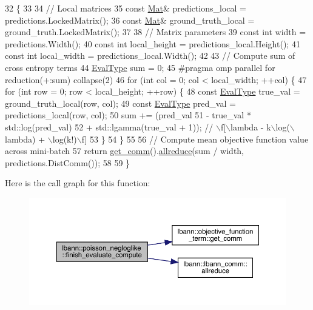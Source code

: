 \begin{DoxyCode}
32                                                                  \{
33 
34   \textcolor{comment}{// Local matrices}
35   \textcolor{keyword}{const} \hyperlink{base_8hpp_a68f11fdc31b62516cb310831bbe54d73}{Mat}& predictions\_local = predictions.LockedMatrix();
36   \textcolor{keyword}{const} \hyperlink{base_8hpp_a68f11fdc31b62516cb310831bbe54d73}{Mat}& ground\_truth\_local = ground\_truth.LockedMatrix();
37   
38   \textcolor{comment}{// Matrix parameters}
39   \textcolor{keyword}{const} \textcolor{keywordtype}{int} width = predictions.Width();
40   \textcolor{keyword}{const} \textcolor{keywordtype}{int} local\_height = predictions\_local.Height();
41   \textcolor{keyword}{const} \textcolor{keywordtype}{int} local\_width = predictions\_local.Width();
42 
43   \textcolor{comment}{// Compute sum of cross entropy terms}
44   \hyperlink{base_8hpp_a3266f5ac18504bbadea983c109566867}{EvalType} sum = 0;
45 \textcolor{preprocessor}{  #pragma omp parallel for reduction(+:sum) collapse(2)}
46   \textcolor{keywordflow}{for} (\textcolor{keywordtype}{int} col = 0; col < local\_width; ++col) \{
47     \textcolor{keywordflow}{for} (\textcolor{keywordtype}{int} row = 0; row < local\_height; ++row) \{
48       \textcolor{keyword}{const} \hyperlink{base_8hpp_a3266f5ac18504bbadea983c109566867}{EvalType} true\_val = ground\_truth\_local(row, col);
49       \textcolor{keyword}{const} \hyperlink{base_8hpp_a3266f5ac18504bbadea983c109566867}{EvalType} pred\_val = predictions\_local(row, col);
50       sum += (pred\_val
51               - true\_val * std::log(pred\_val)
52               + std::lgamma(true\_val + 1)); \textcolor{comment}{// \(\backslash\)f[\(\backslash\)lambda - k\(\backslash\)log(\(\backslash\)lambda) + \(\backslash\)log(k!)\(\backslash\)f]}
53     \}
54   \}
55 
56   \textcolor{comment}{// Compute mean objective function value across mini-batch}
57   \textcolor{keywordflow}{return} \hyperlink{classlbann_1_1objective__function__term_a5f89b676a26a6b76ddc26563ac87beb9}{get\_comm}().\hyperlink{classlbann_1_1lbann__comm_af5631e5f0f54e4df4958eba9df2599ef}{allreduce}(sum / width, predictions.DistComm());
58 
59 \}
\end{DoxyCode}
Here is the call graph for this function\+:\nopagebreak
\begin{figure}[H]
\begin{center}
\leavevmode
\includegraphics[width=350pt]{classlbann_1_1poisson__negloglike_a67c3cb239905fa9ee57369dddbbe76ed_cgraph}
\end{center}
\end{figure}
